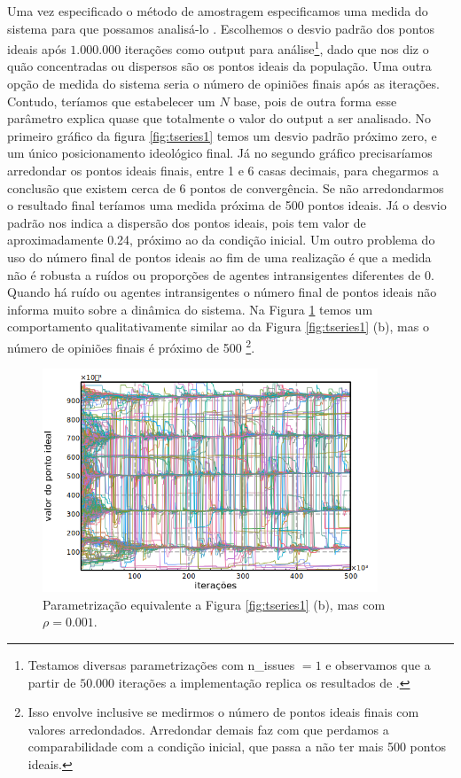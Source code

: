     Uma vez especificado o método de amostragem especificamos uma medida do
    sistema para que possamos analisá-lo \cite{railsback2012agent}. Escolhemos o
    desvio padrão dos pontos ideais após \(1.000.000\) iterações como output
    para análise\footnote{Testamos diversas parametrizações com n\_issues \(=
      1\) e observamos que a partir de \(50.000\) iterações a implementação
      replica os resultados de .}, dado que nos
    diz o quão concentradas ou dispersos são os pontos ideais da população. Uma
    outra opção de medida do sistema seria o número de opiniões finais após as
    iterações. Contudo, teríamos que estabelecer um \(N\) base, pois de outra
    forma esse parâmetro explica quase que totalmente o valor do output a ser
    analisado. No primeiro gráfico da figura \ref{fig:tseries1} temos um desvio
    padrão próximo zero, e um único posicionamento ideológico final. Já no
    segundo gráfico precisaríamos arredondar os pontos ideais finais, entre 1 e
    6 casas decimais, para chegarmos a conclusão que existem cerca de 6 pontos
    de convergência. Se não arredondarmos o resultado final teríamos uma medida
    próxima de 500 pontos ideais. Já o desvio padrão nos indica a dispersão dos
    pontos ideais, pois tem valor de aproximadamente 0.24, próximo ao da
    condição inicial. Um outro problema do uso do número final de pontos ideais
    ao fim de uma realização é que a medida não é robusta a ruídos ou proporções
    de agentes intransigentes diferentes de 0. Quando há ruído ou agentes
    intransigentes o número final de pontos ideais não informa muito sobre a
    dinâmica do sistema. Na Figura \ref{fig:nonnullrho} temos um comportamento
    qualitativamente similar ao da Figura \ref{fig:tseries1} (b), mas o número
    de opiniões finais é próximo de 500 \footnote{Isso envolve inclusive se
      medirmos o número de pontos ideais finais com valores arredondados.
      Arredondar demais faz com que perdamos a comparabilidade com a condição
      inicial, que passa a não ter mais 500 pontos ideais.}.
    
  \begin{figure}[H]
    \centering
    \includegraphics[width =10cm]{ims/ts5.png}
    \caption{Parametrização equivalente a Figura \ref{fig:tseries1} (b), mas com \(\rho =
      0.001\).}
    \label{fig:nonnullrho}
  \end{figure}

